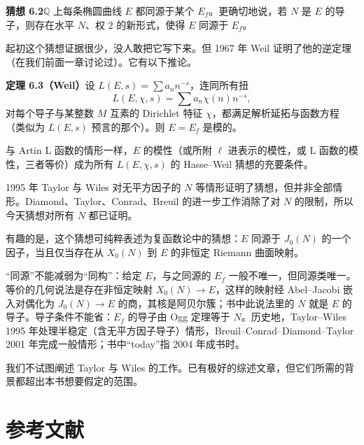 \par\medskip\noindent\textbf{猜想 6.2}\quad $\mathbb{Q}$ 上每条椭圆曲线 $E$ 都同源于某个 $E_f$。更确切地说，若 $N$ 是 $E$ 的导子，则存在水平 $N$、权 $2$ 的新形式，使得 $E$ 同源于 $E_f$。

起初这个猜想证据很少，没人敢把它写下来。但 1967 年 Weil 证明了他的逆定理（在我们前面一章讨论过）。它有以下推论。

\par\medskip\noindent\textbf{定理 6.3（Weil）}\quad 设 $L(E,s)=\sum a_nn^{-s}$，连同所有扭
\begin{equation}\tag{6.2}\label{c5:eq:6.2}
L(E,\chi,s)=\sum a_n\chi(n)n^{-s},
\end{equation}
对每个导子与某整数 $M$ 互素的 Dirichlet 特征 $\chi$，都满足解析延拓与函数方程（类似为 $L(E,s)$ 预言的那个）。则 $E=E_f$ 是模的。

与 Artin L 函数的情形一样，$E$ 的模性（或所附 $\ell$ 进表示的模性，或 L 函数的模性，三者等价）成为所有 $L(E,\chi,s)$ 的 Hasse--Weil 猜想的充要条件。

1995 年 Taylor 与 Wiles 对无平方因子的 $N$ 等情形证明了猜想，但并非全部情形。Diamond、Taylor、Conrad、Breuil 的进一步工作消除了对 $N$ 的限制，所以今天猜想对所有 $N$ 都已证明。

有趣的是，这个猜想可纯粹表述为复函数论中的猜想：$E$ 同源于 $J_0(N)$ 的一个因子，当且仅当存在从 $X_0(N)$ 到 $E$ 的非恒定 Riemann 曲面映射。

\begin{annote}
“同源”不能减弱为“同构”：给定 $E$，与之同源的 $E_f$ 一般不唯一，但同源类唯一。等价的几何说法是存在非恒定映射 $X_0(N)\to E$，这样的映射经 Abel--Jacobi 嵌入对偶化为 $J_0(N)\to E$ 的商，其核是阿贝尔簇；书中此说法里的 $N$ 就是 $E$ 的导子。导子条件不能省：$E_f$ 的导子由 Ogg 定理等于 $N$。历史地，Taylor--Wiles 1995 年处理半稳定（含无平方因子导子）情形，Breuil--Conrad--Diamond--Taylor 2001 年完成一般情形；书中“today”指 2004 年成书时。
\par\vspace{0.15em}{\raggedleft 【来源：Darmon--Diamond--Taylor《Fermat's last theorem》综述（A）；Cornell--Silverman--Stevens 编《Modular Forms and Fermat's Last Theorem》（A）】\par}
\end{annote}

我们不试图阐述 Taylor 与 Wiles 的工作。已有极好的综述文章，但它们所需的背景都超出本书想要假定的范围。

\section*{参考文献}\label{c5:sec:ref}

